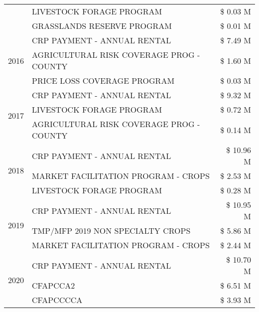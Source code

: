 \begin{tabular}{llr}
 & LIVESTOCK FORAGE PROGRAM & \$ 0.03 M \\
 & GRASSLANDS RESERVE PROGRAM & \$ 0.01 M \\
\cline{1-3}
\multirow[t]{3}{*}{2016} & CRP PAYMENT - ANNUAL RENTAL & \$ 7.49 M \\
 & AGRICULTURAL RISK COVERAGE PROG - COUNTY & \$ 1.60 M \\
 & PRICE LOSS COVERAGE PROGRAM & \$ 0.03 M \\
\cline{1-3}
\multirow[t]{3}{*}{2017} & CRP PAYMENT - ANNUAL RENTAL & \$ 9.32 M \\
 & LIVESTOCK FORAGE PROGRAM & \$ 0.72 M \\
 & AGRICULTURAL RISK COVERAGE PROG - COUNTY & \$ 0.14 M \\
\cline{1-3}
\multirow[t]{3}{*}{2018} & CRP PAYMENT - ANNUAL RENTAL & \$ 10.96 M \\
 & MARKET FACILITATION PROGRAM - CROPS & \$ 2.53 M \\
 & LIVESTOCK FORAGE PROGRAM & \$ 0.28 M \\
\cline{1-3}
\multirow[t]{3}{*}{2019} & CRP PAYMENT - ANNUAL RENTAL & \$ 10.95 M \\
 & TMP/MFP 2019 NON SPECIALTY CROPS & \$ 5.86 M \\
 & MARKET FACILITATION PROGRAM - CROPS & \$ 2.44 M \\
\cline{1-3}
\multirow[t]{3}{*}{2020} & CRP PAYMENT - ANNUAL RENTAL & \$ 10.70 M \\
 & CFAPCCA2 & \$ 6.51 M \\
 & CFAPCCCCA & \$ 3.93 M \\
\cline{1-3}
\bottomrule
\end{tabular}
